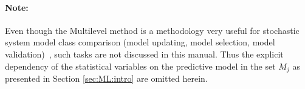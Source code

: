\paragraph*{Note:} Even though the Multilevel method is a methodology very useful for  stochastic system model class comparison (model updating, model selection, model validation)~\cite{Cheung_2009A}, such tasks are not discussed in this manual. Thus the explicit dependency of the statistical variables on the predictive model in the set  $M_j$ as presented in Section \ref{sec:ML:intro} are omitted herein.















